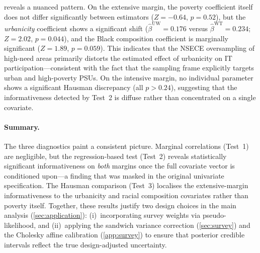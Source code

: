 reveals a nuanced pattern.  On the extensive
margin, the poverty coefficient itself does not differ significantly
between estimators ($Z = -0.64$, $p = 0.52$), but the
\emph{urbanicity} coefficient shows a significant shift
($\hat{\beta}^{\mathrm{UW}} = 0.176$ versus
$\hat{\beta}^{\mathrm{WT}} = 0.234$; $Z = 2.02$, $p = 0.044$), and
the Black composition coefficient is marginally significant ($Z = 1.89$,
$p = 0.059$).  This indicates that the NSECE oversampling of
high-need areas primarily distorts the estimated effect of urbanicity
on IT participation---consistent with the fact that the sampling frame
explicitly targets urban and high-poverty PSUs.  On the intensive
margin, no individual parameter shows a significant Hausman
discrepancy (all $p > 0.24$), suggesting that the informativeness
detected by Test~2 is diffuse rather than concentrated on a single
covariate.

\paragraph{Summary.}
The three diagnostics paint a consistent picture.  Marginal correlations
(Test~1) are negligible, but the regression-based test (Test~2) reveals
statistically significant informativeness on \emph{both} margins once
the full covariate vector is conditioned upon---a finding that was
masked in the original univariate specification.  The Hausman comparison
(Test~3) localises the extensive-margin informativeness to the
urbanicity and racial composition covariates rather than poverty itself.
Together, these results justify two design choices in the main
analysis (\cref{sec:application}): (i)~incorporating survey weights
via pseudo-likelihood, and (ii)~applying the sandwich variance
correction (\cref{sec:survey}) and the Cholesky affine calibration
(\cref{app:survey}) to ensure that posterior credible intervals
reflect the true design-adjusted uncertainty.
